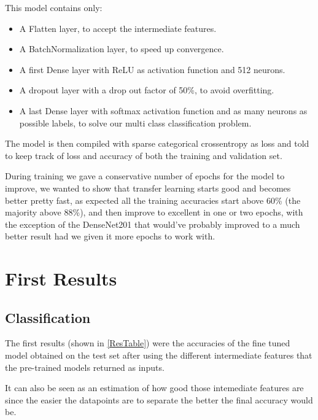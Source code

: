 \documentclass[conference]{IEEEtran}
\begin{document}
This model contains only:
\begin{itemize}
\item{A Flatten layer, to accept the intermediate features.}
\item{A BatchNormalization layer, to speed up convergence.}
\item{A first Dense layer with ReLU as activation function and 512 neurons.}
\item{A dropout layer with a drop out factor of 50\%, to avoid overfitting.}
\item{A last Dense layer with softmax activation function and as many neurons as possible labels, to solve our multi class classification problem.}
\end{itemize}
The model is then compiled with sparse categorical crossentropy as loss and told to keep track of loss and accuracy of both the training and validation set.

During training we gave a conservative number of epochs for the model to improve, we wanted to show that transfer learning starts good and becomes
better pretty fast, as expected all the training accuracies start above 60\% (the majority above 88\%), and then improve to excellent in one or two epochs, with the exception of the DenseNet201 that would've probably improved to a much better result had we given it more epochs to work with.

\section{First Results}
\subsection{Classification}
The first results (shown in \ref{ResTable}) were the accuracies of the fine tuned model obtained on the test set after using the different intermediate features that the pre-trained models returned as inputs.

It can also be seen as an estimation of how good those intemediate features are since the easier the datapoints are to separate the better the final accuracy would be.
\end{document}
